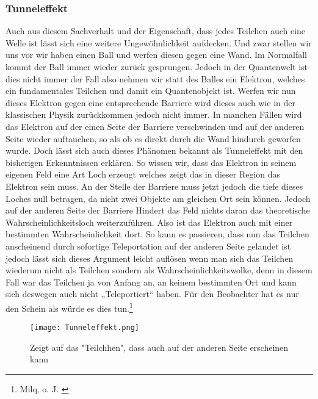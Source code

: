 \documentclass[12pt]{report}
\begin{document}
\subsubsection{Tunneleffekt}
Auch aus diesem Sachverhalt und der Eigenschaft, dass jedes Teilchen auch eine Welle ist lässt sich eine weitere Ungewöhnlichkeit aufdecken. Und zwar stellen wir uns vor wir haben einen Ball und werfen diesen gegen eine Wand. Im Normalfall kommt der Ball immer wieder zurück gesprungen. Jedoch in der Quantenwelt ist dies nicht immer der Fall also nehmen wir statt des Balles ein Elektron, welches ein fundamentales Teilchen und damit ein Quantenobjekt ist. Werfen wir nun dieses Elektron gegen eine entsprechende Barriere wird dieses auch wie in der klassischen Physik zurückkommen jedoch nicht immer. In manchen Fällen wird das Elektron auf der einen Seite der Barriere verschwinden und auf der anderen Seite wieder auftauchen, so als ob es direkt durch die Wand hindurch geworfen wurde. Doch lässt sich auch dieses Phänomen bekannt als Tunneleffekt mit den bisherigen Erkenntnissen erklären. So wissen wir, dass das Elektron in seinem eigenen Feld eine Art Loch erzeugt welches zeigt das in dieser Region das Elektron sein muss. An der Stelle der Barriere muss jetzt jedoch die tiefe dieses Loches null betragen, da nicht zwei Objekte am gleichen Ort sein können. Jedoch auf der anderen Seite der Barriere Hindert das Feld nichts daran das theoretische Wahrscheinlichkeitsloch weiterzuführen. Also ist das Elektron auch mit einer bestimmten Wahrscheinlichkeit dort. So kann es passieren, dass nun das Teilchen anscheinend durch sofortige Teleportation auf der anderen Seite gelandet ist jedoch lässt sich dieses Argument leicht auflösen wenn man sich das Teilchen wiederum nicht als Teilchen  
sondern als Wahrscheinlichkeitswolke, denn in diesem Fall war das Teilchen ja von Anfang an, an keinem bestimmten Ort und kann sich deswegen auch nicht „Teleportiert“ haben. Für den Beobachter hat es nur den Schein als würde es dies tun.\footnote{Milq, o. J. \cite{a222-3}} 
\begin{figure}[h]
\texttt{[image: Tunneleffekt.png]}
\centering
 	 	\caption{
 	 	Zeigt auf das "Teilchhen", dass auch auf der anderen Seite erscheinen kann
 	 	}
\end{figure}
\end{document}
